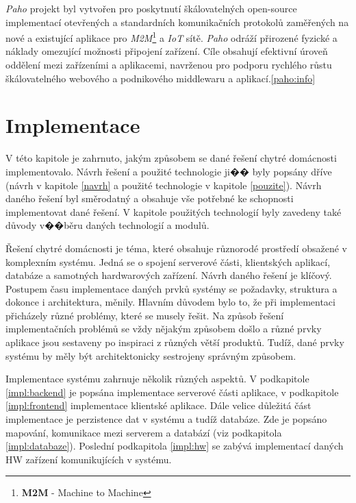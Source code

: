 \emph{Paho} projekt byl vytvořen pro poskytnutí škálovatelných open-source implementací otevřených a standardních komunikačních protokolů zaměřených na nové a
existující aplikace pro \emph{M2M}\footnote{\textbf{M2M} - Machine to Machine} a \emph{IoT} sítě.
\emph{Paho} odráží přirozené fyzické a náklady omezující možnosti připojení zařízení.
Cíle obsahují efektivní úroveň oddělení mezi zařízeními a aplikacemi, navrženou pro podporu rychlého růstu škálovatelného webového a podnikového middlewaru a aplikací.\ref{paho:info}

\chapter{Implementace}
\label{impl}
V této kapitole je zahrnuto, jakým způsobem se dané řešení chytré domácnosti implementovalo.
Návrh řešení a použité technologie ji�� byly popsány dříve (návrh v kapitole \ref{navrh} a použité technologie v kapitole \ref{pouzite}).
Návrh daného řešení byl směrodatný a obsahuje vše potřebné ke schopnosti implementovat dané řešení.
V kapitole použitých technologií byly zavedeny také důvody v��běru daných technologií a modulů.

Řešení chytré domácnosti je téma, které obsahuje různorodé prostředí obsažené v komplexním systému.
Jedná se o spojení serverové části, klientských aplikací, databáze a samotných hardwarových zařízení.
Návrh daného řešení je klíčový.
Postupem času implementace daných prvků systémy se požadavky, struktura a dokonce i architektura, měnily.
Hlavním důvodem bylo to, že při implementaci přicházely různé problémy, které se musely řešit.
Na způsob řešení implementačních problémů se vždy nějakým způsobem došlo a různé prvky aplikace jsou sestaveny po inspiraci z různých větší produktů.
Tudíž, dané prvky systému by měly být architektonicky sestrojeny správným způsobem.

Implementace systému zahrnuje několik různých aspektů.
V podkapitole \ref{impl:backend} je popsána implementace serverové části aplikace, v podkapitole \ref{impl:frontend} implementace klientské aplikace.
Dále velice důležitá část implementace je perzistence dat v systému a tudíž databáze. Zde je popsáno mapování, komunikace mezi serverem a databází (viz podkapitola \ref{impl:databaze}).
Poslední podkapitola \ref{impl:hw} se zabývá implementací daných HW zařízení komunikujících v systému.

